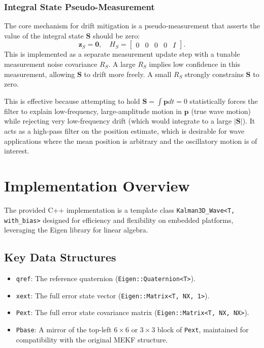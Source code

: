 \documentclass[11pt]{article}
\begin{document}
\subsubsection{Integral State Pseudo-Measurement}
\label{sssec:pseudomeas}
The core mechanism for drift mitigation is a pseudo-measurement that asserts the value of the integral state $\bm{S}$ should be zero:
\begin{equation}
\bm{z}_S = \bm{0}, \quad H_S = \begin{bmatrix} 0 & 0 & 0 & 0 & I \end{bmatrix}.
\end{equation}
This is implemented as a separate measurement update step with a tunable measurement noise covariance $R_S$. A large $R_S$ implies low confidence in this measurement, allowing $\bm{S}$ to drift more freely. A small $R_S$ strongly constrains $\bm{S}$ to zero.

This is effective because attempting to hold $\bm{S} = \int \bm{p}  dt = 0$ statistically forces the filter to explain low-frequency, large-amplitude motion in $\bm{p}$ (true wave motion) while rejecting very low-frequency drift (which would integrate to a large $|\bm{S}|$). It acts as a high-pass filter on the position estimate, which is desirable for wave applications where the mean position is arbitrary and the oscillatory motion is of interest.

\section{Implementation Overview}
\label{sec:implementation}

The provided C++ implementation is a template class \texttt{Kalman3D\_Wave<T, with\_bias>} designed for efficiency and flexibility on embedded platforms, leveraging the Eigen library for linear algebra.

\subsection{Key Data Structures}
\begin{itemize}
    \item \texttt{qref}: The reference quaternion (\texttt{Eigen::Quaternion<T>}).
    \item \texttt{xext}: The full error state vector (\texttt{Eigen::Matrix<T, NX, 1>}).
    \item \texttt{Pext}: The full error state covariance matrix (\texttt{Eigen::Matrix<T, NX, NX>}).
    \item \texttt{Pbase}: A mirror of the top-left $6\times6$ or $3\times3$ block of \texttt{Pext}, maintained for compatibility with the original MEKF structure.
\end{itemize}
\end{document}
